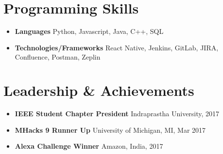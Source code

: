 \documentclass[letterpaper,11pt]{article}
\newcommand{\resumeItem}[2]{
  \item\small{
    \textbf{#1}{#2 \vspace{-2pt}}
  }
}
\newcommand{\resumeSubItem}[2]{\resumeItem{#1}{#2}\vspace{-4pt}}
\newcommand{\resumeSubHeadingListStart}{\begin{itemize}[leftmargin=*]}
\newcommand{\resumeSubHeadingListEnd}{\end{itemize}}
\begin{document}
\section{Programming Skills}
  \resumeSubHeadingListStart
    \resumeSubItem{Languages }
      {Python, Javascript, Java, C++, SQL}
    \resumeSubItem{Technologies/Frameworks }
      {React Native, Jenkins, GitLab, JIRA, Confluence, Postman, Zeplin}
  \resumeSubHeadingListEnd


\section{Leadership \& Achievements}
  \resumeSubHeadingListStart
    \resumeSubItem{IEEE Student Chapter \text{\textbar} President }
      {Indraprastha University, 2017}
    \resumeSubItem{MHacks 9 \text{\textbar} Runner Up }
      {University of Michigan, MI, Mar 2017}
    \resumeSubItem{Alexa Challenge \text{\textbar} Winner }
      {Amazon, India, 2017}
  \resumeSubHeadingListEnd


\end{document}
